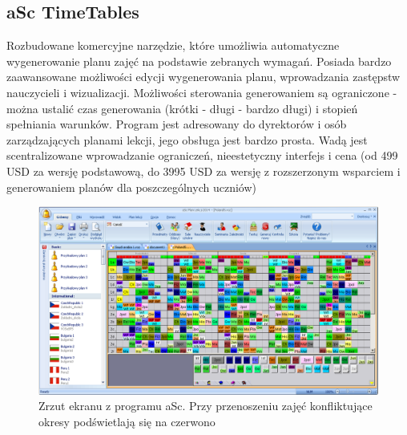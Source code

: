 \subsection{aSc TimeTables}
Rozbudowane komercyjne narzędzie, które umożliwia automatyczne wygenerowanie planu zajęć na podstawie zebranych wymagań. Posiada bardzo zaawansowane możliwości edycji wygenerowania planu, wprowadzania zastępstw nauczycieli i wizualizacji. Możliwości sterowania generowaniem są ograniczone - można ustalić czas generowania (krótki - długi - bardzo długi) i stopień spełniania warunków. Program jest adresowany do dyrektorów i osób zarządzających planami lekcji, jego obsługa jest bardzo prosta. Wadą jest scentralizowane wprowadzanie ograniczeń, nieestetyczny interfejs i cena 
(od 499 USD za wersję podstawową, do 3995 USD za wersję z rozszerzonym wsparciem i generowaniem planów dla poszczególnych uczniów)
\begin{figure}[H]
\includegraphics[width=15cm]{img/asc2.png}
\caption{Zrzut ekranu z programu aSc. Przy przenoszeniu zajęć konfliktujące okresy podświetlają się na czerwono}
\end{figure}

